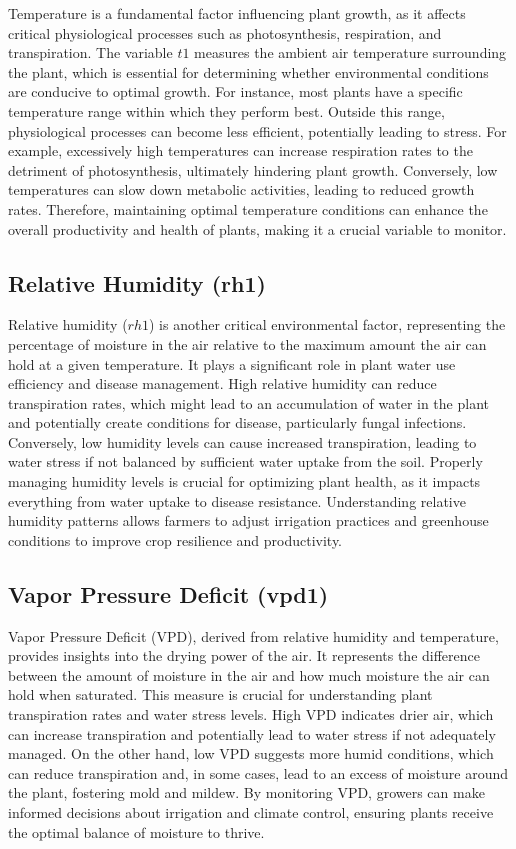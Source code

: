 Temperature is a fundamental factor influencing plant growth, as it affects critical physiological processes such as photosynthesis, respiration, and transpiration. The variable \( t1 \) measures the ambient air temperature surrounding the plant, which is essential for determining whether environmental conditions are conducive to optimal growth. For instance, most plants have a specific temperature range within which they perform best. Outside this range, physiological processes can become less efficient, potentially leading to stress. For example, excessively high temperatures can increase respiration rates to the detriment of photosynthesis, ultimately hindering plant growth. Conversely, low temperatures can slow down metabolic activities, leading to reduced growth rates. Therefore, maintaining optimal temperature conditions can enhance the overall productivity and health of plants, making it a crucial variable to monitor.

\subsection{Relative Humidity (rh1)}

Relative humidity (\( rh1 \)) is another critical environmental factor, representing the percentage of moisture in the air relative to the maximum amount the air can hold at a given temperature. It plays a significant role in plant water use efficiency and disease management. High relative humidity can reduce transpiration rates, which might lead to an accumulation of water in the plant and potentially create conditions for disease, particularly fungal infections. Conversely, low humidity levels can cause increased transpiration, leading to water stress if not balanced by sufficient water uptake from the soil. Properly managing humidity levels is crucial for optimizing plant health, as it impacts everything from water uptake to disease resistance. Understanding relative humidity patterns allows farmers to adjust irrigation practices and greenhouse conditions to improve crop resilience and productivity.

\subsection{Vapor Pressure Deficit (vpd1)}

Vapor Pressure Deficit (VPD), derived from relative humidity and temperature, provides insights into the drying power of the air. It represents the difference between the amount of moisture in the air and how much moisture the air can hold when saturated. This measure is crucial for understanding plant transpiration rates and water stress levels. High VPD indicates drier air, which can increase transpiration and potentially lead to water stress if not adequately managed. On the other hand, low VPD suggests more humid conditions, which can reduce transpiration and, in some cases, lead to an excess of moisture around the plant, fostering mold and mildew. By monitoring VPD, growers can make informed decisions about irrigation and climate control, ensuring plants receive the optimal balance of moisture to thrive.

